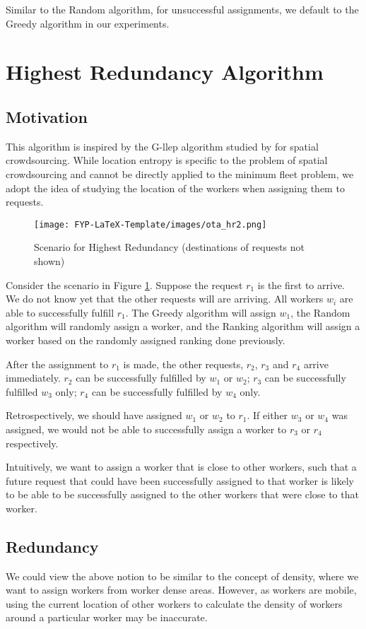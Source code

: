 \documentclass[urop]{socreport}
\begin{document}
Similar to the Random algorithm, for unsuccessful assignments, we default to the Greedy algorithm in our experiments.

\section{Highest Redundancy Algorithm}
\subsection{Motivation}
This algorithm is inspired by the G-llep algorithm studied by \cite{kazemi} for spatial crowdsourcing. While location entropy is specific to the problem of spatial crowdsourcing and cannot be directly applied to the minimum fleet problem, we adopt the idea of studying the location of the workers when assigning them to requests.

\begin{figure}[h]
    \centering
    \texttt{[image: FYP-LaTeX-Template/images/ota\_hr2.png]}
    \caption{Scenario for Highest Redundancy (destinations of requests not shown)}
    \label{fig:hr}
\end{figure}

Consider the scenario in Figure \ref{fig:hr}. Suppose the request $r_1$ is the first to arrive. We do not know yet that the other requests will are arriving. All workers $w_i$ are able to successfully fulfill $r_1$. The Greedy algorithm will assign  $w_1$, the Random algorithm will randomly assign a worker, and the Ranking algorithm will assign a worker based on the randomly assigned ranking done previously.

After the assignment to $r_1$ is made, the other requests, $r_2$, $r_3$ and $r_4$ arrive immediately. $r_2$ can be successfully fulfilled by $w_1$ or $w_2$; $r_3$ can be successfully fulfilled $w_3$ only; $r_4$ can be successfully fulfilled by $w_4$ only. 

Retrospectively, we should have assigned $w_1$ or $w_2$ to $r_1$. If either $w_3$ or $w_4$ was assigned, we would not be able to successfully assign a worker to $r_3$ or $r_4$ respectively.

Intuitively, we want to assign a worker that is close to other workers, such that a future request that could have been successfully assigned to that worker is likely to be able to be successfully assigned to the other workers that were close to that worker.

\subsection{Redundancy}
We could view the above notion to be similar to the concept of density, where we want to assign workers from worker dense areas. However, as workers are mobile, using the current location of other workers to calculate the density of workers around a particular worker may be inaccurate.
\end{document}
